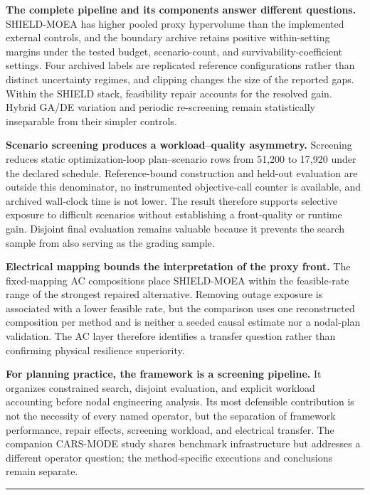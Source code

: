 \documentclass[energies,article,submit,moreauthors]{Definitions/mdpi}
\begin{document}
\textbf{The complete pipeline and its components answer different questions.} SHIELD-MOEA has higher pooled proxy hypervolume than the implemented external controls, and the boundary archive retains positive within-setting margins under the tested budget, scenario-count, and survivability-coefficient settings. Four archived labels are replicated reference configurations rather than distinct uncertainty regimes, and clipping changes the size of the reported gaps. Within the SHIELD stack, feasibility repair accounts for the resolved gain. Hybrid GA/DE variation and periodic re-screening remain statistically inseparable from their simpler controls.

\textbf{Scenario screening produces a workload--quality asymmetry.} Screening reduces static optimization-loop plan--scenario rows from 51,200 to 17,920 under the declared schedule. Reference-bound construction and held-out evaluation are outside this denominator, no instrumented objective-call counter is available, and archived wall-clock time is not lower. The result therefore supports selective exposure to difficult scenarios without establishing a front-quality or runtime gain. Disjoint final evaluation remains valuable because it prevents the search sample from also serving as the grading sample.

\textbf{Electrical mapping bounds the interpretation of the proxy front.} The fixed-mapping AC compositions place SHIELD-MOEA within the feasible-rate range of the strongest repaired alternative. Removing outage exposure is associated with a lower feasible rate, but the comparison uses one reconstructed composition per method and is neither a seeded causal estimate nor a nodal-plan validation. The AC layer therefore identifies a transfer question rather than confirming physical resilience superiority.

\textbf{For planning practice, the framework is a screening pipeline.} It organizes constrained search, disjoint evaluation, and explicit workload accounting before nodal engineering analysis. Its most defensible contribution is not the necessity of every named operator, but the separation of framework performance, repair effects, screening workload, and electrical transfer. The companion CARS-MODE study \cite{ref42} shares benchmark infrastructure but addresses a different operator question; the method-specific executions and conclusions remain separate.

\begin{center}\rule{0.5\linewidth}{0.5pt}\end{center}
\end{document}
